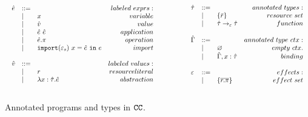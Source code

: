 \begin{figure}
\vspace{-0.6cm}
\[
\begin{array}{lll}

\begin{array}{lllr}

\hat e & ::= & ~ & labeled~exprs: \\
	& | & x & variable \\
	& | & \hat v & value \\
	& | & \hat e ~ \hat e & application \\
	& | & \hat e.\pi & operation \\
	& | & \mathtt{import}(\varepsilon_s)~x = \hat e~\mathtt{in}~e & import \\
	&&\\

\hat v & ::= & ~ & labeled~values: \\
	& | & r & resource literal\\
	& | & \lambda x: \hat \tau.\hat e & abstraction \\
	&&\\

\end{array}

& ~~~~~~~~&

\begin{array}{lllr}

\hat \tau & ::= & ~ & annotated ~types: \\
		& | & \{ \bar r \} & resource~set\\
		& | & \hat \tau \rightarrow_{\varepsilon} \hat \tau & function \\
		&&\\

\hat \Gamma & ::= & ~ & annotated~type~ctx:\\
				& | & \varnothing & empty~ctx.\\
				& | & \hat \Gamma, x: \hat \tau & binding \\
				&&\\

\varepsilon & ::= & ~ & effects: \\
		& | & \{ \overline{r.\pi} \} & effect~set \\
		&&\\

\end{array}

\end{array}
\]
\vspace{-0.6cm}
\caption{Annotated programs and types in $\mathtt{CC}$.}
\vspace{-0.6cm}
\label{fig:epscalc_annotated_grammar}
\end{figure}

